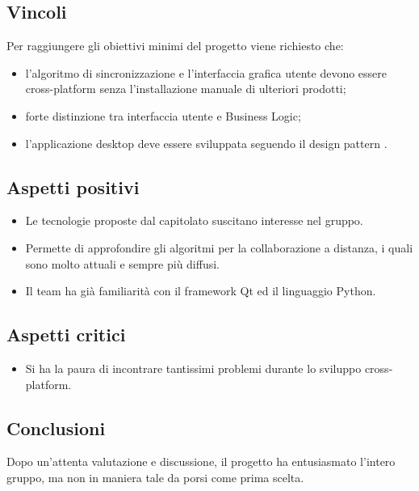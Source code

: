 \subsection{Vincoli}
Per raggiungere gli obiettivi minimi del progetto viene richiesto che:
\begin{itemize}
	\item l'algoritmo di sincronizzazione e l'interfaccia grafica utente devono essere cross-platform senza l'installazione manuale di ulteriori prodotti;
	\item forte distinzione tra interfaccia utente e Business Logic;
	\item l'applicazione desktop deve essere sviluppata seguendo il design pattern .
\end{itemize}

\subsection{Aspetti positivi}
\begin{itemize}
	\item Le tecnologie proposte dal capitolato suscitano interesse nel gruppo.
	\item Permette di approfondire gli algoritmi per la collaborazione a distanza, i quali sono molto attuali e sempre più diffusi.
	\item Il team ha già familiarità con il framework Qt ed il linguaggio Python.
\end{itemize}

\subsection{Aspetti critici}
\begin{itemize}
	\item Si ha la paura di incontrare tantissimi problemi durante lo sviluppo cross-platform.
\end{itemize}

\subsection{Conclusioni}
Dopo un'attenta valutazione e discussione, il progetto ha entusiasmato l'intero gruppo, ma non in maniera tale da porsi come prima scelta.
